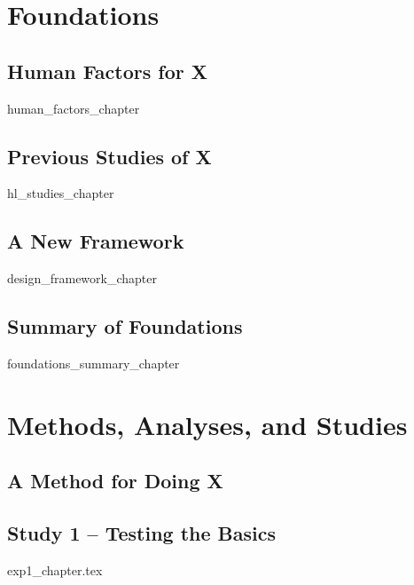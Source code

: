 \documentclass[11pt, oneside, a4paper]{book}
\begin{document}
\part{Foundations} %
\label{Part1:Foundations}

\chapter{Human Factors for X} \label{ch:HumanFactors}
{human_factors_chapter}

\chapter{Previous Studies of X} \label{ch:HighlightingStudies}
{hl_studies_chapter}

\chapter{A New Framework} \label{ch:DesignFramework}
{design_framework_chapter}

\chapter{Summary of Foundations} \label{ch:FoundationsSummary}
{foundations_summary_chapter}

\part{Methods, Analyses, and Studies} %
\label{Part2:MethodsStudies}

\chapter{A Method for Doing X} \label{ch:MethodOverview}


\chapter{Study 1 -- Testing the Basics} \label{ch:Exp1}
\graphicspath{{../exp1_latex/exp1/}}
{exp1_chapter.tex}
\end{document}
